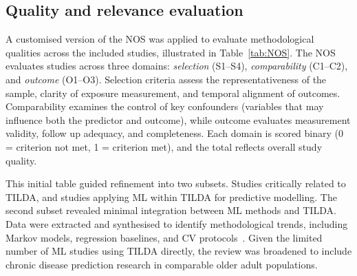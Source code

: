\subsection{Quality and relevance evaluation} 
A customised version of the \gls{NOS} was applied to evaluate methodological qualities across the included studies, illustrated in Table~\ref{tab:NOS}. 
The \gls{NOS} evaluates studies across three domains: \emph{selection} (S1--S4), \emph{comparability} (C1--C2), and \emph{outcome} (O1--O3). 
Selection criteria assess the representativeness of the sample, clarity of exposure measurement, and temporal alignment of outcomes. 
Comparability examines the control of key confounders (variables that may influence both the predictor and outcome), while outcome evaluates measurement validity, follow up adequacy, and completeness. 
Each domain is scored binary (0 = criterion not met, 1 = criterion met), and the total reflects overall study quality.

This initial table guided refinement into two subsets. Studies critically related to \gls{TILDA}, and studies applying \gls{ML} within \gls{TILDA} for predictive modelling. The second subset revealed minimal integration between \gls{ML} methods and \gls{TILDA}. Data were extracted and synthesised to identify methodological trends, including Markov models, regression baselines, and \gls{CV} protocols~\cite{kitchenhamSystematicLiteratureReviews2009a}. Given the limited number of \gls{ML} studies using \gls{TILDA} directly, the review was broadened to include chronic disease prediction research in comparable older adult populations.

